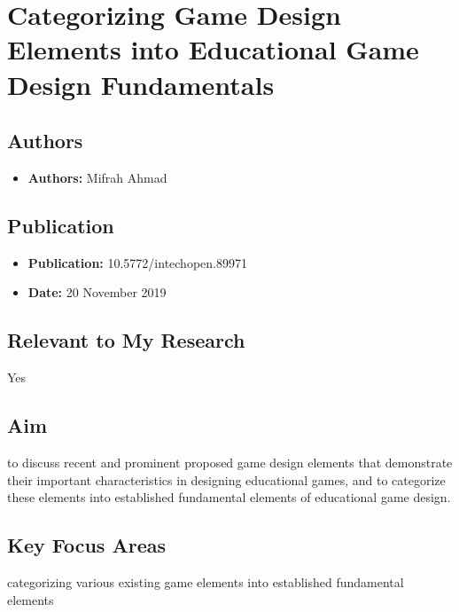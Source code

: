 \section{Categorizing Game Design Elements into Educational Game Design Fundamentals}

\subsection{Authors}
\begin{itemize}
    \item \textbf{Authors:} Mifrah Ahmad
\end{itemize}

\subsection{Publication}
\begin{itemize}
    \item \textbf{Publication:}  10.5772/intechopen.89971
    \item \textbf{Date:} 20 November 2019
\end{itemize}

\subsection{Relevant to My Research}
Yes

\subsection{Aim}
to discuss recent and prominent proposed game design elements that demonstrate 
their important characteristics in designing educational games, and to categorize these elements into established fundamental elements of educational game design.

\subsection{Key Focus Areas}
categorizing various existing game elements into established fundamental elements

